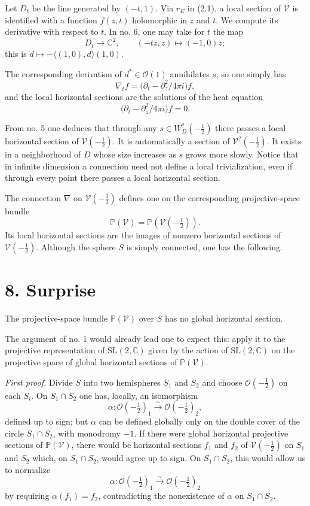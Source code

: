 \documentclass[12pt,a4paper]{article}
\theoremstyle{plain}
\theoremstyle{definition}
\theoremstyle{remark}
\begin{document}
Let $D_t$ be the line generated by $(-t,1)$. Via $r_E$ in (2.1), a local section of $\mathscr V$ is identified with a function $f(z,t)$ holomorphic in $z$ and $t$. We compute its derivative with respect to $t$. In no. 6, one may take for $t$ the map
\[
D_t\to \mathbb C^2,\qquad (-tz,z)\mapsto (-1,0)z;
\]
this is $d\mapsto -\langle(1,0),d\rangle(1,0)$.

The corresponding derivation of $d^*\in \mathcal O(1)$ annihilates $s$, so one simply has
\begin{equation}\label{eq:7.1}
\nabla_t f=\bigl(\partial_t-\partial_z^2/4\pi i\bigr)f,\tag{7.1}
\end{equation}
and the local horizontal sections are the solutions of the heat equation
\begin{equation}\label{eq:7.2}
\bigl(\partial_t-\partial_z^2/4\pi i\bigr)f=0.\tag{7.2}
\end{equation}

From no. 5 one deduces that through any $s\in W_D^?(-\frac12)$ there passes a local horizontal section of $\mathscr V(-\frac12)$. It is automatically a section of $\mathscr V^?(-\frac12)$. It exists in a neighborhood of $D$ whose size increases as $s$ grows more slowly. Notice that in infinite dimension a connection need not define a local trivialization, even if through every point there passes a local horizontal section.

The connection $\nabla$ on $\mathscr V(-\frac12)$ defines one on the corresponding projective-space bundle
\[
\mathbb P(\mathscr V)=\mathbb P(\mathscr V(-\tfrac12)).
\]
Its local horizontal sections are the images of nonzero horizontal sections of $\mathscr V(-\frac12)$. Although the sphere $S$ is simply connected, one has the following.

\section*{8. Surprise}

The projective-space bundle $\mathbb P(\mathscr V)$ over $S$ has no global horizontal section.

The argument of no. 1 would already lead one to expect this: apply it to the projective representation of $\mathrm{SL}(2,\mathbb C)$ given by the action of $\mathrm{SL}(2,\mathbb C)$ on the projective space of global horizontal sections of $\mathbb P(\mathscr V)$.

\medskip
\noindent\textit{First proof.} Divide $S$ into two hemispheres $S_1$ and $S_2$ and choose $\mathcal O(-\frac12)$ on each $S_i$. On $S_1\cap S_2$ one has, locally, an isomorphism
\[
\alpha\colon \mathcal O(-\tfrac12)_1\xrightarrow{\sim}\mathcal O(-\tfrac12)_2,
\]
defined up to sign; but $\alpha$ can be defined globally only on the double cover of the circle $S_1\cap S_2$, with monodromy $-1$. If there were global horizontal projective sections of $\mathbb P(\mathscr V)$, there would be horizontal sections $f_1$ and $f_2$ of $\mathscr V(-\frac12)$ on $S_1$ and $S_2$ which, on $S_1\cap S_2$, would agree up to sign. On $S_1\cap S_2$, this would allow us to normalize
\[
\alpha\colon \mathcal O(-\tfrac12)_1\xrightarrow{\sim}\mathcal O(-\tfrac12)_2
\]
by requiring $\alpha(f_1)=f_2$, contradicting the nonexistence of $\alpha$ on $S_1\cap S_2$.
\end{document}

